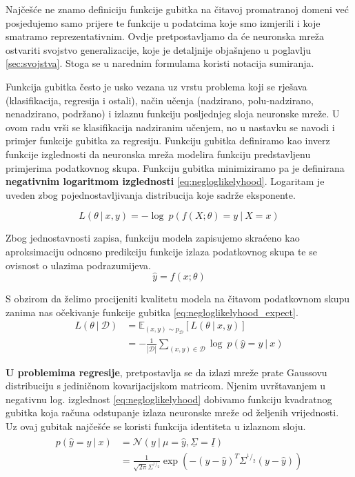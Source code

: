 \documentclass[times, utf8, diplomski]{fer}
\def\mat#1{\underline{#1}}
\def\expect{\mathbb{E}}
\def\normal{\mathcal{N}}
\def\probsep{\ |\ }
\def\dataset{\mathcal{D}}
\begin{document}
Najčešće ne znamo definiciju funkcije gubitka na čitavoj promatranoj domeni već posjedujemo samo prijere te funkcije u podatcima koje smo izmjerili i koje smatramo reprezentativnim. Ovdje pretpostavljamo da će neuronska mreža ostvariti svojstvo generalizacije, koje je detaljnije objašnjeno u poglavlju \ref{sec:svojstva}. Stoga se u narednim formulama koristi notacija sumiranja.

Funkcija gubitka često je usko vezana uz vrstu problema koji se rješava (klasifikacija, regresija i ostali), način učenja (nadzirano, polu-nadzirano, nenadzirano, podržano) i izlaznu funkciju posljednjeg sloja neuronske mreže. U ovom radu vrši se klasifikacija nadziranim učenjem, no u nastavku se navodi i primjer funkcije gubitka za regresiju. Funkciju gubitka definiramo kao inverz funkcije izglednosti da neuronska mreža modelira funkciju predstavljenu primjerima podatkovnog skupa. Funkciju gubitka minimiziramo pa je definirana \textbf{negativnim logaritmom izglednosti} \eqref{eq:negloglikelyhood}. Logaritam je uveden zbog pojednostavljivanja distribucija koje sadrže eksponente.

\begin{equation}
\label{eq:negloglikelyhood}
L(\theta \probsep x,y) = -\log\ p(f(X;\theta)=y \probsep X=x)
\end{equation}

Zbog jednostavnosti zapisa, funkciju modela zapisujemo skraćeno kao aproksimaciju odnosno predikciju funkcije izlaza podatkovnog skupa te se ovisnost o ulazima podrazumijeva.
\begin{equation}
\hat{y} = f(x; \theta)
\end{equation}

 S obzirom da želimo procijeniti kvalitetu modela na čitavom podatkovnom skupu zanima nas očekivanje funkcije gubitka \eqref{eq:negloglikelyhood_expect}.
\begin{equation}
\label{eq:negloglikelyhood_expect}
\begin{split}
L(\theta \probsep \dataset) &= \expect_{(x,y) \sim p_\dataset}[L(\theta \probsep x,y)] \\
&= -\frac{1}{|\dataset|} \sum_{(x,y)\in\dataset} \log\ p(\hat{y}=y \probsep x)
\end{split}
\end{equation}

\textbf{U problemima regresije}, pretpostavlja se da izlazi mreže prate Gaussovu distribuciju s jediničnom kovarijacijskom matricom. Njenim uvrštavanjem u negativnu log. izglednost \eqref{eq:negloglikelyhood} dobivamo funkciju kvadratnog gubitka koja računa odstupanje izlaza neuronske mreže od željenih vrijednosti. Uz ovaj gubitak najčešće se koristi funkcija identiteta u izlaznom sloju.
\begin{align}
\label{eq:normal_dist}
\begin{split}
p(\hat{y}=y \probsep x) &= \normal(y \probsep \mu=\hat{y}, \mat{\Sigma}=\mat{I}) \\
&= \frac{1}{\sqrt{2\pi}\Sigma^{^1/_2}} \exp(-(y-\hat{y})^T\Sigma^{^1/_2}(y-\hat{y}))
\end{split}
\end{align}
\end{document}
